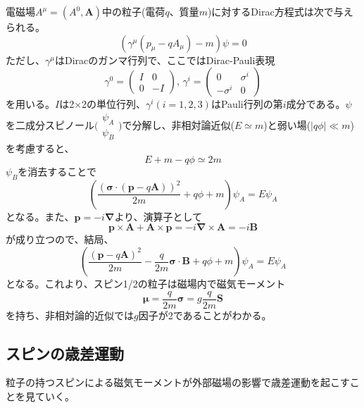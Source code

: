 電磁場$A^{\mu}=(A^0,\bm{A})$中の粒子(電荷$q$、質量$m$)に対するDirac方程式は次で与えられる。
\begin{equation}
\left(\gamma^{\mu}(p_{\mu}-qA_{\mu})-m\right)\psi=0
\end{equation}
ただし、$\gamma^{\mu}$はDiracのガンマ行列で、ここではDirac-Pauli表現
\begin{equation}
\gamma^0=\begin{pmatrix} I & 0 \\ 0 & -I \end{pmatrix},\,
\gamma^i=\begin{pmatrix} 0 & \sigma^i \\ -\sigma^i & 0 \end{pmatrix}
\end{equation}
を用いる。$I$は2×2の単位行列、$\gamma^i(i=1,2,3)$はPauli行列の第$i$成分である。$\psi$を二成分スピノール$\bigl( \begin{smallmatrix} \psi_A \\ \psi_B \end{smallmatrix} \bigr)$で分解し、非相対論近似($E\simeq m$)と弱い場($|q\phi|\ll m$)を考慮すると、
\begin{equation}
E+m-q\phi\simeq2m
\end{equation}
$\psi_B$を消去することで
\begin{equation}
\left(\frac{(\bm{\sigma}\cdot(\bm{p}-q\bm{A}))^2}{2m}+q\phi+m\right)\psi_A=E\psi_A
\end{equation}
となる。また、$\bm{p}=-i\bm{\nabla}$より、演算子として
\begin{equation}
\bm{p}\times\bm{A}+\bm{A}\times\bm{p}=-i\bm{\nabla}\times\bm{A}=-i\bm{B}
\end{equation}
が成り立つので、結局、
\begin{equation}
\left(\frac{(\bm{p}-q\bm{A})^2}{2m}-\frac{q}{2m}\bm{\sigma}\cdot\bm{B}+q\phi+m\right)\psi_A=E\psi_A
\end{equation}
となる。これより、スピン1/2の粒子は磁場内で磁気モーメント
\begin{equation}
\bm{\mu}=\frac{q}{2m}\bm{\sigma}=g\frac{q}{2m}\bm{S}
\end{equation}
を持ち、非相対論的近似では$g$因子が2であることがわかる。

\subsection{スピンの歳差運動}
粒子の持つスピンによる磁気モーメントが外部磁場の影響で歳差運動を起こすことを見ていく。

